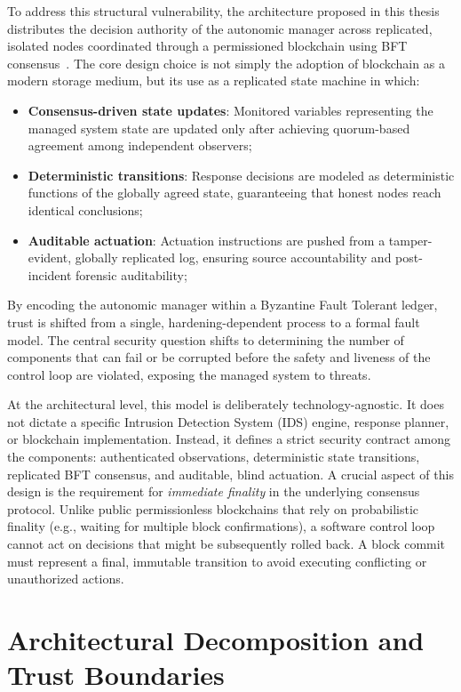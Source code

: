 To address this structural vulnerability, the architecture proposed in this thesis distributes the decision authority of the autonomic manager across replicated, isolated nodes coordinated through a permissioned blockchain using BFT consensus~\cite{albero2026blockchain}. The core design choice is not simply the adoption of blockchain as a modern storage medium, but its use as a replicated state machine in which:
\begin{itemize}
    \item \textbf{Consensus-driven state updates}: Monitored variables representing the managed system state are updated only after achieving quorum-based agreement among independent observers;
    \item \textbf{Deterministic transitions}: Response decisions are modeled as deterministic functions of the globally agreed state, guaranteeing that honest nodes reach identical conclusions;
    \item \textbf{Auditable actuation}: Actuation instructions are pushed from a tamper-evident, globally replicated log, ensuring source accountability and post-incident forensic auditability;
\end{itemize}

By encoding the autonomic manager within a Byzantine Fault Tolerant ledger, trust is shifted from a single, hardening-dependent process to a formal fault model. The central security question shifts to determining the number of components that can fail or be corrupted before the safety and liveness of the control loop are violated, exposing the managed system to threats. 

At the architectural level, this model is deliberately technology-agnostic. It does not dictate a specific Intrusion Detection System (IDS) engine, response planner, or blockchain implementation. Instead, it defines a strict security contract among the components: authenticated observations, deterministic state transitions, replicated BFT consensus, and auditable, blind actuation. A crucial aspect of this design is the requirement for \emph{immediate finality} in the underlying consensus protocol. Unlike public permissionless blockchains that rely on probabilistic finality (e.g., waiting for multiple block confirmations), a software control loop cannot act on decisions that might be subsequently rolled back. A block commit must represent a final, immutable transition to avoid executing conflicting or unauthorized actions.

\section{Architectural Decomposition and Trust Boundaries}
\label{sec:architecture_decomposition}

